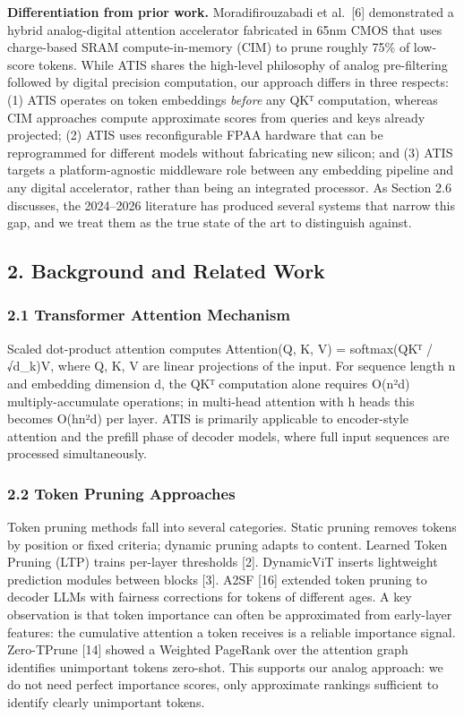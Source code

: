 \textbf{Differentiation from prior work.} Moradifirouzabadi et
al.~{[}6{]} demonstrated a hybrid analog-digital attention accelerator
fabricated in 65nm CMOS that uses charge-based SRAM compute-in-memory
(CIM) to prune roughly 75\% of low-score tokens. While ATIS shares the
high-level philosophy of analog pre-filtering followed by digital
precision computation, our approach differs in three respects: (1) ATIS
operates on token embeddings \emph{before} any QKᵀ computation, whereas
CIM approaches compute approximate scores from queries and keys already
projected; (2) ATIS uses reconfigurable FPAA hardware that can be
reprogrammed for different models without fabricating new silicon; and
(3) ATIS targets a platform-agnostic middleware role between any
embedding pipeline and any digital accelerator, rather than being an
integrated processor. As Section 2.6 discusses, the 2024--2026
literature has produced several systems that narrow this gap, and we
treat them as the true state of the art to distinguish against.

\subsection{2. Background and Related
Work}\label{background-and-related-work}

\subsubsection{2.1 Transformer Attention
Mechanism}\label{transformer-attention-mechanism}

Scaled dot-product attention computes Attention(Q, K, V) = softmax(QKᵀ /
√d\_k)V, where Q, K, V are linear projections of the input. For sequence
length n and embedding dimension d, the QKᵀ computation alone requires
O(n²d) multiply-accumulate operations; in multi-head attention with h
heads this becomes O(hn²d) per layer. ATIS is primarily applicable to
encoder-style attention and the prefill phase of decoder models, where
full input sequences are processed simultaneously.

\subsubsection{2.2 Token Pruning
Approaches}\label{token-pruning-approaches}

Token pruning methods fall into several categories. Static pruning
removes tokens by position or fixed criteria; dynamic pruning adapts to
content. Learned Token Pruning (LTP) trains per-layer thresholds
{[}2{]}. DynamicViT inserts lightweight prediction modules between
blocks {[}3{]}. A2SF {[}16{]} extended token pruning to decoder LLMs
with fairness corrections for tokens of different ages. A key
observation is that token importance can often be approximated from
early-layer features: the cumulative attention a token receives is a
reliable importance signal. Zero-TPrune {[}14{]} showed a Weighted
PageRank over the attention graph identifies unimportant tokens
zero-shot. This supports our analog approach: we do not need perfect
importance scores, only approximate rankings sufficient to identify
clearly unimportant tokens.

